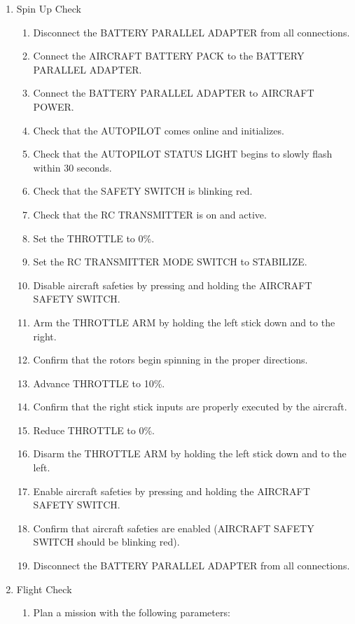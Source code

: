 \documentclass{report}
\begin{document}
\begin{enumerate}
\begin{enumerate}
\begin{enumerate}
						\end{enumerate}
					\item Spin Up Check
						\begin{enumerate}
							\item Disconnect the BATTERY PARALLEL ADAPTER from all connections.
							\item Connect the AIRCRAFT BATTERY PACK to the BATTERY PARALLEL ADAPTER.
							\item Connect the BATTERY PARALLEL ADAPTER to AIRCRAFT POWER.
							\item Check that the AUTOPILOT comes online and initializes.
							\item Check that the AUTOPILOT STATUS LIGHT begins to slowly flash within 30 seconds.
							\item Check that the SAFETY SWITCH is blinking red.
							\item Check that the RC TRANSMITTER is on and active.
							\item Set the THROTTLE to 0\%.
							\item Set the RC TRANSMITTER MODE SWITCH to STABILIZE.
							\item Disable aircraft safeties by pressing and holding the AIRCRAFT SAFETY SWITCH.
							\item Arm the THROTTLE ARM by holding the left stick down and to the right.
							\item Confirm that the rotors begin spinning in the proper directions.
							\item Advance THROTTLE to 10\%.
							\item Confirm that the right stick inputs are properly executed by the aircraft.
							\item Reduce THROTTLE to 0\%.
							\item Disarm the THROTTLE ARM by holding the left stick down and to the left.
							\item Enable aircraft safeties by pressing and holding the AIRCRAFT SAFETY SWITCH.
							\item Confirm that aircraft safeties are enabled (AIRCRAFT SAFETY SWITCH should be blinking red).
							\item Disconnect the BATTERY PARALLEL ADAPTER from all connections.
						\end{enumerate}
					\item Flight Check
						\begin{enumerate}
							\item Plan a mission with the following parameters:

\end{enumerate}
\end{enumerate}
\end{enumerate}
\end{document}
